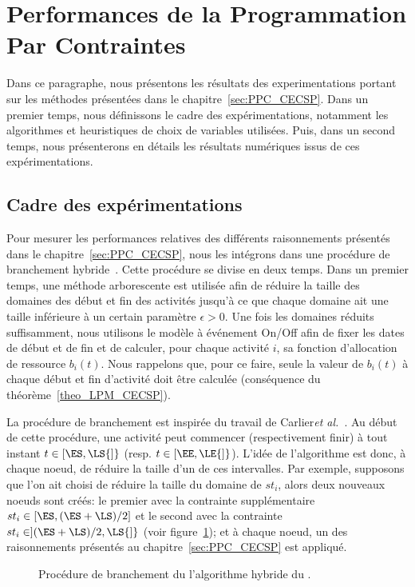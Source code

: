 \section{Performances de la Programmation Par Contraintes}
\label{sec:expe_PPC}
Dans ce paragraphe, nous présentons les résultats des experimentations
portant sur les méthodes présentées dans le
chapitre~\ref{sec:PPC_CECSP}. Dans un premier temps, nous définissons
le cadre des expérimentations, notamment les algorithmes et
heuristiques de choix de variables utilisées. Puis, dans un second
temps, nous présenterons en détails les résultats numériques issus de
ces expérimentations. 

\subsection{Cadre des expérimentations}
\label{sec:hybridBB}
Pour mesurer les performances relatives des différents raisonnements
présentés dans le chapitre~\ref{sec:PPC_CECSP}, nous les intégrons
dans une procédure de branchement
hybride~\cite{Nattaf_Constraints,Nattaf_ORSpectrum}. Cette procédure
se divise en deux temps. Dans un premier temps, une méthode 
arborescente est utilisée afin de réduire la taille des domaines des
début et fin des activités jusqu'à ce que chaque domaine ait une
taille inférieure à un certain paramètre $\epsilon >0$. Une fois les
domaines réduits suffisamment, nous utilisons le modèle à événement
On/Off afin de fixer les dates de début et de fin et de calculer, pour
chaque activité $i$, sa fonction d'allocation de ressource
$b_i(t)$. Nous rappelons que, pour ce faire, seule la valeur de
$b_i(t)$ à chaque début et fin d'activité doit être calculée
(conséquence du théorème~\ref{theo_LPM_CECSP}).

La procédure de branchement est inspirée du travail de Carlier{\it et
  al.}~\cite{Carlier}. Au début de cette procédure, une activité peut
commencer (respectivement finir) à tout instant $t \in [\ES,\LS{]}$
(resp. $t \in [\EE,\LE{]}$). L'idée de l'algorithme est donc, à chaque
noeud, de réduire la taille d'un de ces intervalles. Par exemple,
supposons que l'on ait choisi de réduire la taille du domaine de
$st_i$, alors deux nouveaux noeuds sont créés: le premier avec la
contrainte supplémentaire $st_i \in [\ES , (\ES+\LS) / 2]$ et le
second avec la contrainte $st_i \in ](\ES+\LS) / 2,\LS{]}$ (voir
figure~\ref{fig:branching}); et à chaque noeud, un des raisonnements
présentés au chapitre~\ref{sec:PPC_CECSP} est appliqué.

\begin{figure}[!htb] 
  
  \caption{Procédure de branchement du l'algorithme hybride du \CECSP.}
  \label{fig:branching}
\end{figure}

